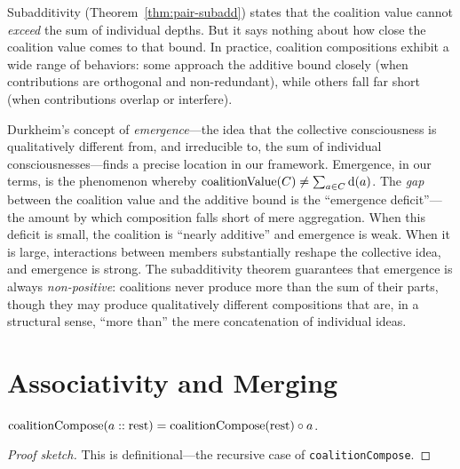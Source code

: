 \begin{remark}
\label{rem:emergence}
Subadditivity (Theorem~\ref{thm:pair-subadd}) states that the coalition
value cannot \emph{exceed} the sum of individual depths.  But it says nothing
about how close the coalition value comes to that bound.  In practice,
coalition compositions exhibit a wide range of behaviors: some approach
the additive bound closely (when contributions are orthogonal and
non-redundant), while others fall far short (when contributions overlap or
interfere).

Durkheim's concept of \emph{emergence}---the idea that the collective
consciousness is qualitatively different from, and irreducible to, the sum
of individual consciousnesses---finds a precise location in our framework.
Emergence, in our terms, is the phenomenon whereby
$\operatorname{coalitionValue}(C) \ne \sum_{a \in C} \operatorname{d}(a)$.  The
\emph{gap} between the coalition value and the additive bound is the
``emergence deficit''---the amount by which composition falls short of
mere aggregation.  When this deficit is small, the coalition is ``nearly
additive'' and emergence is weak.  When it is large, interactions between
members substantially reshape the collective idea, and emergence is strong.
The subadditivity theorem guarantees that emergence is always
\emph{non-positive}: coalitions never produce more than the sum of their
parts, though they may produce qualitatively different compositions that
are, in a structural sense, ``more than'' the mere concatenation of
individual ideas.
\end{remark}

\section{Associativity and Merging}
\label{sec:ch13-assoc}

\begin{theorem}
\label{thm:coal-unfold}
$\operatorname{coalitionCompose}(a :: \text{rest}) =
\operatorname{coalitionCompose}(\text{rest}) \circ a$.
\end{theorem}

\begin{proof}[Proof sketch]
This is definitional---the recursive case of \texttt{coalitionCompose}.
\end{proof}

